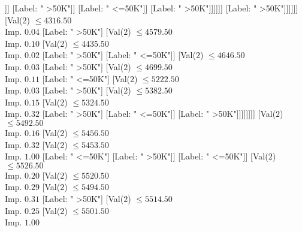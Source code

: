 \documentclass[margin=10pt]{standalone}
\begin{document}
\begin{forest}
																																					[Label: " <=50K"]
																																					[Label: " >50K"]]]
																																			[Label: " >50K"]]
																																		[Label: " <=50K"]]
																																	[Label: " >50K"]]]]]]
																												[Label: " >50K"]]]]]]
																							[Val($2$) $ \leq 4316.50$ \\ Imp. $0.04$
																								[Label: " >50K"]
																								[Val($2$) $ \leq 4579.50$ \\ Imp. $0.10$
																									[Val($2$) $ \leq 4435.50$ \\ Imp. $0.02$
																										[Label: " >50K"]
																										[Label: " <=50K"]]
																									[Val($2$) $ \leq 4646.50$ \\ Imp. $0.03$
																										[Label: " >50K"]
																										[Val($2$) $ \leq 4699.50$ \\ Imp. $0.11$
																											[Label: " <=50K"]
																											[Val($2$) $ \leq 5222.50$ \\ Imp. $0.03$
																												[Label: " >50K"]
																												[Val($2$) $ \leq 5382.50$ \\ Imp. $0.15$
																													[Val($2$) $ \leq 5324.50$ \\ Imp. $0.32$
																														[Label: " >50K"]
																														[Label: " <=50K"]]
																													[Label: " >50K"]]]]]]]]
																						[Val($2$) $ \leq 5492.50$ \\ Imp. $0.16$
																							[Val($2$) $ \leq 5456.50$ \\ Imp. $0.32$
																								[Val($2$) $ \leq 5453.50$ \\ Imp. $1.00$
																									[Label: " <=50K"]
																									[Label: " >50K"]]
																								[Label: " <=50K"]]
																							[Val($2$) $ \leq 5526.50$ \\ Imp. $0.20$
																								[Val($2$) $ \leq 5520.50$ \\ Imp. $0.29$
																									[Val($2$) $ \leq 5494.50$ \\ Imp. $0.31$
																										[Label: " >50K"]
																										[Val($2$) $ \leq 5514.50$ \\ Imp. $0.25$
																											[Val($2$) $ \leq 5501.50$ \\ Imp. $1.00$

\end{forest}
\end{document}
